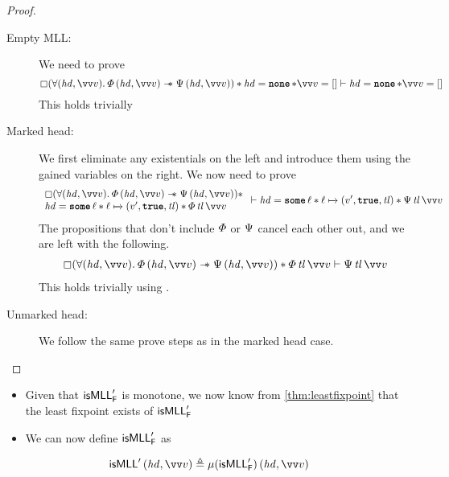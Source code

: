 \documentclass[thesis.tex]{subfiles}
\begin{document}
\begin{example}
\begin{proof}
        \begin{description}
            \item[Empty MLL:] We need to prove
                \[ \always(\All(\hd, \vect{\val}). \pred\,(\hd, \vect{\val}) \wand \predB\,(\hd, \vect{\val})) * \hd = \None * \vect{\val} = [] \proves \hd = \None * \vect{\val} = [] \]
                This holds trivially
            \item[Marked head:] We first eliminate any existentials on the left and introduce them using the gained variables on the right. We now need to prove
                \begin{align*}
                    \begin{array}{l}
                        \always(\All(\hd, \vect{\val}). \pred\,(\hd, \vect{\val}) \wand \predB\,(\hd, \vect{\val})) * \\
                        \hd = \Some \loc * \loc \fmapsto (\val', \True, \tl) * \pred\, \tl\, \vect{v}
                    \end{array} \proves
                    \hd = \Some \loc * \loc \fmapsto (\val', \True, \tl) * \predB\, \tl\, \vect{v}
                \end{align*}
                The propositions that don't include $\varPhi$ or $\Psi$ cancel each other out, and we are left with the following.
                \begin{align*}
                    \always(\All(\hd, \vect{\val}). \pred\,(\hd, \vect{\val}) \wand \predB\,(\hd, \vect{\val})) * \pred\, \tl\, \vect{v} \proves \predB\, \tl\, \vect{v}
                \end{align*}
                This holds trivially using .
            \item[Unmarked head:] We follow the same prove steps as in the marked head case. \qedhere
        \end{description}
    \end{proof}
    \begin{itemize}
        \item Given that $\textsf{\upshape isMLL}'_{\textsf{\upshape F}}$ is monotone, we now know from \cref*{thm:leastfixpoint} that the least fixpoint exists of $\textsf{\upshape isMLL}'_{\textsf{\upshape F}}$
        \item We can now define $\textsf{\upshape isMLL}'_{\textsf{\upshape F}}$ as
    \end{itemize}
    \begin{align*}
        \isMLL'\, (\hd, \vect{\val}) & \eqdef \lfp(\isMLL'_\hopred)\, (\hd, \vect{\val})                                                          \\

\end{align*}
\end{example}
\end{document}
